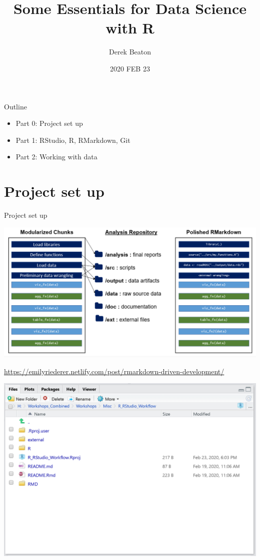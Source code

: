 \documentclass[
  ignorenonframetext,
]{beamer}
\title{Some Essentials for Data Science with R}
\author{Derek Beaton}
\date{2020 FEB 23}
\providecommand{\tightlist}{%
  \setlength{\itemsep}{0pt}\setlength{\parskip}{0pt}}
\begin{document}
\frame{\titlepage}

\begin{frame}{Outline}
\protect\hypertarget{outline}{}

\begin{itemize}[<+->]
\tightlist
\item
  Part 0: Project set up
\item
  Part 1: RStudio, R, RMarkdown, Git
\item
  Part 2: Working with data
\end{itemize}

\end{frame}

\hypertarget{project-set-up}{%
\section{Project set up}\label{project-set-up}}

\begin{frame}{Project set up}

\includegraphics{../external/images/setup_4_markdown_project.PNG}

\url{https://emilyriederer.netlify.com/post/rmarkdown-driven-development/}

\end{frame}

\begin{frame}

\includegraphics{../external/images/this_project.PNG}

\end{frame}
\end{document}
